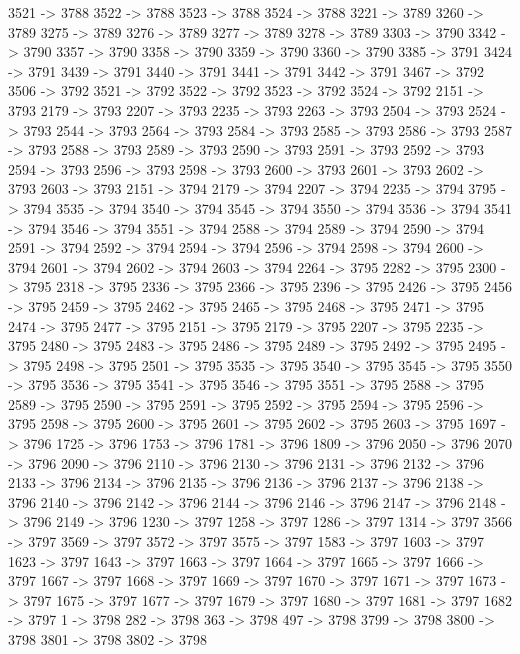 {	3521 -> 3788
	3522 -> 3788
	3523 -> 3788
	3524 -> 3788
	3221 -> 3789
	3260 -> 3789
	3275 -> 3789
	3276 -> 3789
	3277 -> 3789
	3278 -> 3789
	3303 -> 3790
	3342 -> 3790
	3357 -> 3790
	3358 -> 3790
	3359 -> 3790
	3360 -> 3790
	3385 -> 3791
	3424 -> 3791
	3439 -> 3791
	3440 -> 3791
	3441 -> 3791
	3442 -> 3791
	3467 -> 3792
	3506 -> 3792
	3521 -> 3792
	3522 -> 3792
	3523 -> 3792
	3524 -> 3792
	2151 -> 3793
	2179 -> 3793
	2207 -> 3793
	2235 -> 3793
	2263 -> 3793
	2504 -> 3793
	2524 -> 3793
	2544 -> 3793
	2564 -> 3793
	2584 -> 3793
	2585 -> 3793
	2586 -> 3793
	2587 -> 3793
	2588 -> 3793
	2589 -> 3793
	2590 -> 3793
	2591 -> 3793
	2592 -> 3793
	2594 -> 3793
	2596 -> 3793
	2598 -> 3793
	2600 -> 3793
	2601 -> 3793
	2602 -> 3793
	2603 -> 3793
	2151 -> 3794
	2179 -> 3794
	2207 -> 3794
	2235 -> 3794
	3795 -> 3794
	3535 -> 3794
	3540 -> 3794
	3545 -> 3794
	3550 -> 3794
	3536 -> 3794
	3541 -> 3794
	3546 -> 3794
	3551 -> 3794
	2588 -> 3794
	2589 -> 3794
	2590 -> 3794
	2591 -> 3794
	2592 -> 3794
	2594 -> 3794
	2596 -> 3794
	2598 -> 3794
	2600 -> 3794
	2601 -> 3794
	2602 -> 3794
	2603 -> 3794
	2264 -> 3795
	2282 -> 3795
	2300 -> 3795
	2318 -> 3795
	2336 -> 3795
	2366 -> 3795
	2396 -> 3795
	2426 -> 3795
	2456 -> 3795
	2459 -> 3795
	2462 -> 3795
	2465 -> 3795
	2468 -> 3795
	2471 -> 3795
	2474 -> 3795
	2477 -> 3795
	2151 -> 3795
	2179 -> 3795
	2207 -> 3795
	2235 -> 3795
	2480 -> 3795
	2483 -> 3795
	2486 -> 3795
	2489 -> 3795
	2492 -> 3795
	2495 -> 3795
	2498 -> 3795
	2501 -> 3795
	3535 -> 3795
	3540 -> 3795
	3545 -> 3795
	3550 -> 3795
	3536 -> 3795
	3541 -> 3795
	3546 -> 3795
	3551 -> 3795
	2588 -> 3795
	2589 -> 3795
	2590 -> 3795
	2591 -> 3795
	2592 -> 3795
	2594 -> 3795
	2596 -> 3795
	2598 -> 3795
	2600 -> 3795
	2601 -> 3795
	2602 -> 3795
	2603 -> 3795
	1697 -> 3796
	1725 -> 3796
	1753 -> 3796
	1781 -> 3796
	1809 -> 3796
	2050 -> 3796
	2070 -> 3796
	2090 -> 3796
	2110 -> 3796
	2130 -> 3796
	2131 -> 3796
	2132 -> 3796
	2133 -> 3796
	2134 -> 3796
	2135 -> 3796
	2136 -> 3796
	2137 -> 3796
	2138 -> 3796
	2140 -> 3796
	2142 -> 3796
	2144 -> 3796
	2146 -> 3796
	2147 -> 3796
	2148 -> 3796
	2149 -> 3796
	1230 -> 3797
	1258 -> 3797
	1286 -> 3797
	1314 -> 3797
	3566 -> 3797
	3569 -> 3797
	3572 -> 3797
	3575 -> 3797
	1583 -> 3797
	1603 -> 3797
	1623 -> 3797
	1643 -> 3797
	1663 -> 3797
	1664 -> 3797
	1665 -> 3797
	1666 -> 3797
	1667 -> 3797
	1668 -> 3797
	1669 -> 3797
	1670 -> 3797
	1671 -> 3797
	1673 -> 3797
	1675 -> 3797
	1677 -> 3797
	1679 -> 3797
	1680 -> 3797
	1681 -> 3797
	1682 -> 3797
	1 -> 3798
	282 -> 3798
	363 -> 3798
	497 -> 3798
	3799 -> 3798
	3800 -> 3798
	3801 -> 3798
	3802 -> 3798
}
